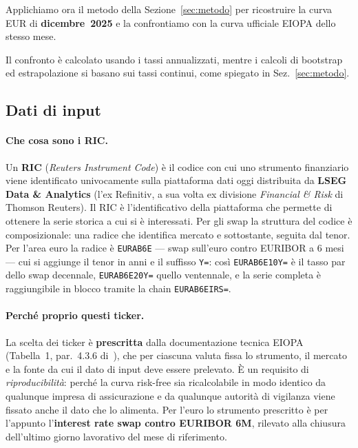 \documentclass[11pt,a4paper]{article}
\theoremstyle{plain}
\theoremstyle{definition}
\theoremstyle{remark}
\begin{document}
Applichiamo ora il metodo della Sezione~\ref{sec:metodo} per ricostruire la curva EUR di
\textbf{dicembre~2025} e la confrontiamo con la curva ufficiale EIOPA dello stesso mese.

Il confronto è calcolato usando i tassi annualizzati, mentre i calcoli di bootstrap ed
estrapolazione si basano sui tassi continui, come spiegato in Sez.~\ref{sec:metodo}.

\subsection{Dati di input}
\label{sec:dati-input-dic}

\paragraph{Che cosa sono i RIC.}
Un \textbf{RIC} (\emph{Reuters Instrument Code}) \`e il codice con cui uno strumento
finanziario viene identificato univocamente sulla piattaforma dati oggi distribuita da
\textbf{LSEG Data \& Analytics} (l'ex Refinitiv, a sua volta ex divisione \emph{Financial \&
Risk} di Thomson Reuters). Il RIC \`e l'identificativo della piattaforma che permette di ottenere la serie storica a cui si è interessati. Per gli swap la struttura del codice \`e composizionale: una radice che
identifica mercato e sottostante, seguita dal tenor. Per l'area euro la radice \`e
\texttt{EURAB6E} --- swap sull'euro contro EURIBOR a 6 mesi --- cui si aggiunge il tenor in
anni e il suffisso \texttt{Y=}: cos\`i \texttt{EURAB6E10Y=} \`e il tasso par dello swap
decennale, \texttt{EURAB6E20Y=} quello ventennale, e la serie completa \`e raggiungibile in
blocco tramite la chain \texttt{EURAB6EIRS=}.

\paragraph{Perch\'e proprio questi ticker.}
La scelta dei ticker \`e \textbf{prescritta} dalla documentazione tecnica
EIOPA (Tabella~1, par.~4.3.6 di~\cite{eiopa2026}), che per ciascuna valuta fissa lo strumento,
il mercato e la fonte da cui il dato di input deve essere prelevato. \`E un requisito di
\emph{riproducibilit\`a}: perch\'e la curva risk-free sia ricalcolabile in modo identico da
qualunque impresa di assicurazione e da qualunque autorit\`a di vigilanza viene fissato 
anche il dato che lo alimenta. Per l'euro lo strumento prescritto
\`e per l'appunto l'\textbf{interest rate swap contro EURIBOR 6M}, rilevato alla chiusura dell'ultimo
giorno lavorativo del mese di riferimento.
\end{document}
